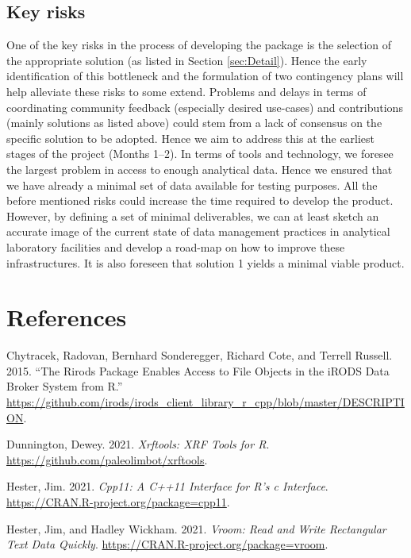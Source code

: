 \documentclass[]{article}
\begin{document}
\hypertarget{key-risks}{%
\subsection{Key risks}\label{key-risks}}

One of the key risks in the process of developing the package is the selection of the appropriate solution (as listed in Section \ref{sec:Detail}). Hence the early identification of this bottleneck and the formulation of two contingency plans will help alleviate these risks to some extend. Problems and delays in terms of coordinating community feedback (especially desired use-cases) and contributions (mainly solutions as listed above) could stem from a lack of consensus on the specific solution to be adopted. Hence we aim to address this at the earliest stages of the project (Months 1--2). In terms of tools and technology, we foresee the largest problem in access to enough analytical data. Hence we ensured that we have already a minimal set of data available for testing purposes. All the before mentioned risks could increase the time required to develop the product. However, by defining a set of minimal deliverables, we can at least sketch an accurate image of the current state of data management practices in analytical laboratory facilities and develop a road-map on how to improve these infrastructures. It is also foreseen that solution 1 yields a minimal viable product.

\hypertarget{references}{%
\section*{References}\label{references}}

\hypertarget{refs}{}
\leavevmode\hypertarget{ref-rirods}{}%
Chytracek, Radovan, Bernhard Sonderegger, Richard Cote, and Terrell Russell. 2015. ``The Rirods Package Enables Access to File Objects in the iRODS Data Broker System from R.'' \url{https://github.com/irods/irods_client_library_r_cpp/blob/master/DESCRIPTION}.

\leavevmode\hypertarget{ref-xrftools}{}%
Dunnington, Dewey. 2021. \emph{Xrftools: XRF Tools for R}. \url{https://github.com/paleolimbot/xrftools}.

\leavevmode\hypertarget{ref-cpp11}{}%
Hester, Jim. 2021. \emph{Cpp11: A C++11 Interface for R's c Interface}. \url{https://CRAN.R-project.org/package=cpp11}.

\leavevmode\hypertarget{ref-vroom}{}%
Hester, Jim, and Hadley Wickham. 2021. \emph{Vroom: Read and Write Rectangular Text Data Quickly}. \url{https://CRAN.R-project.org/package=vroom}.
\end{document}

